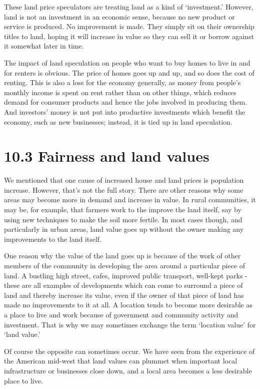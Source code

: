 \documentclass[]{tufte-handout}
\begin{document}
These land price speculators are treating land as a kind of
`investment.' However, land is not an investment in an economic sense,
because no new product or service is produced. No improvement is made.
They simply sit on their ownership titles to land, hoping it will
increase in value so they can sell it or borrow against it somewhat
later in time.

The impact of land speculation on people who want to buy homes to live
in and for renters is obvious. The price of homes goes up and up, and so
does the cost of renting. This is also a loss for the economy generally,
as money from people's monthly income is spent on rent rather than on
other things, which reduces demand for consumer products and hence the
jobs involved in producing them. And investors' money is not put into
productive investments which benefit the economy, such as new
businesses; instead, it is tied up in land speculation.

\hypertarget{fairness-and-land-values}{%
\section{10.3 Fairness and land values}\label{fairness-and-land-values}}

We mentioned that one cause of increased house and land prices is
population increase. However, that's not the full story. There are other
reasons why some areas may become more in demand and increase in value.
In rural communities, it may be, for example, that farmers work to the
improve the land itself, say by using new techniques to make the soil
more fertile. In most cases though, and particularly in urban areas,
land value goes up without the owner making any improvements to the land
itself.

One reason why the value of the land goes up is because of the work of
other members of the community in developing the area around a
particular piece of land. A bustling high street, cafes, improved public
transport, well-kept parks - these are all examples of developments
which can come to surround a piece of land and thereby increase its
value, even if the owner of that piece of land has made no improvements
to it at all. A location tends to become more desirable as a place to
live and work because of government and community activity and
investment. That is why we may sometimes exchange the term `location
value' for `land value.'

Of course the opposite can sometimes occur. We have seen from the
experience of the American mid-west that land values can plummet when
important local infrastructure or businesses close down, and a local
area becomes a less desirable place to live.
\end{document}
